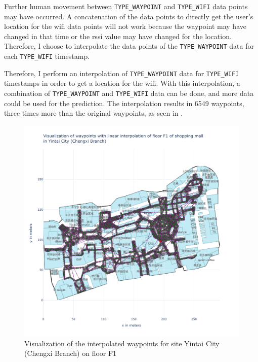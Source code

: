 Further human movement between \texttt{TYPE\_WAYPOINT} and \texttt{TYPE\_WIFI} data points may have occurred.
A concatenation of the data points to directly get the user's location for the \ac{wifi} data points will not work because the waypoint may have changed in that time or the \ac{rssi} value may have changed for the location.
Therefore, I choose to interpolate the data points of the \texttt{TYPE\_WAYPOINT} data for each \texttt{TYPE\_WIFI} timestamp.

Therefore, I perform an interpolation of \texttt{TYPE\_WAYPOINT} data for \texttt{TYPE\_WIFI} timestamps in order to get a location for the \ac{wifi}.
With this interpolation, a combination of \texttt{TYPE\_WAYPOINT} and \texttt{TYPE\_WIFI} data can be done, and more data could be used for the prediction.
The interpolation results in 6549 waypoints, three times more than the original waypoints, as seen in .

\begin{figure}[h!]
    \centering
    \includegraphics[scale=0.6]{images/whole_floor_visualization_interpolated.pdf}
    \caption{Visualization of the interpolated waypoints for site Yintai City (Chengxi Branch) on floor F1}
    \label{fig:vis-interpolated}
\end{figure}

